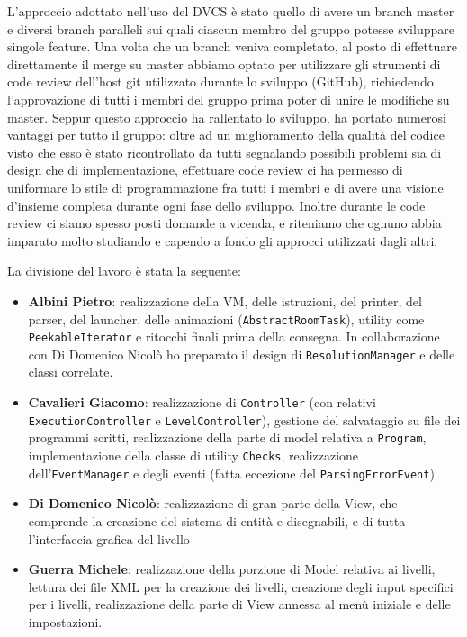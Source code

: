 L'approccio adottato nell'uso del DVCS è stato quello di avere un branch
master e diversi branch paralleli sui quali ciascun membro del gruppo
potesse sviluppare singole feature. Una volta che un branch veniva
completato, al posto di effettuare direttamente il merge su master
abbiamo optato per utilizzare gli strumenti di code review dell'host git
utilizzato durante lo sviluppo (GitHub), richiedendo l'approvazione di
tutti i membri del gruppo prima poter di unire le modifiche su master.
Seppur questo approccio ha rallentato lo sviluppo, ha portato numerosi
vantaggi per tutto il gruppo: oltre ad un miglioramento della qualità
del codice visto che esso è stato ricontrollato da tutti segnalando
possibili problemi sia di design che di implementazione, effettuare code
review ci ha permesso di uniformare lo stile di programmazione fra tutti
i membri e di avere una visione d'insieme completa durante ogni fase
dello sviluppo. Inoltre durante le code review ci siamo spesso posti
domande a vicenda, e riteniamo che ognuno abbia imparato molto studiando
e capendo a fondo gli approcci utilizzati dagli altri.

La divisione del lavoro è stata la seguente:

\begin{itemize}
\item
  \textbf{Albini Pietro}: realizzazione della VM, delle istruzioni, del printer,
  del parser, del launcher, delle animazioni
  (\texttt{AbstractRoomTask}), utility come \texttt{PeekableIterator} e
  ritocchi finali prima della consegna. In collaborazione con Di
  Domenico Nicolò ho preparato il design di \texttt{ResolutionManager} e
  delle classi correlate.
\item
  \textbf{Cavalieri Giacomo}: realizzazione di \texttt{Controller} (con relativi
  \texttt{ExecutionController} e \texttt{LevelController}), gestione del
  salvataggio su file dei programmi scritti, realizzazione della parte
  di model relativa a \texttt{Program}, implementazione della classe di
  utility \texttt{Checks}, realizzazione dell'\texttt{EventManager} e
  degli eventi (fatta eccezione del \texttt{ParsingErrorEvent})
\item
  \textbf{Di Domenico Nicolò}: realizzazione di gran parte della View, che
  comprende la creazione del sistema di entità e disegnabili, e di tutta
  l'interfaccia grafica del livello
\item
  \textbf{Guerra Michele}: realizzazione della porzione di Model relativa ai
  livelli, lettura dei file XML per la creazione dei livelli, creazione
  degli input specifici per i livelli, realizzazione della parte di View
  annessa al menù iniziale e delle impostazioni.
\end{itemize}

